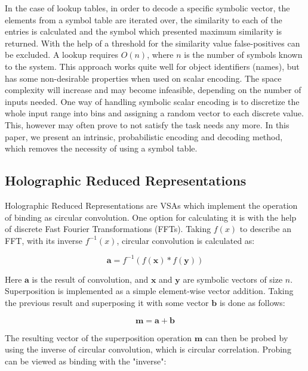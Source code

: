 \documentclass[a4paper,twoside]{article}
\begin{document}
	In the case of lookup tables, in order to decode a specific symbolic vector, the elements from a symbol table are iterated over, the similarity to each of the entries is calculated and the symbol which presented maximum similarity is returned. With the help of a threshold for the similarity value false-positives can be excluded. A lookup requires $O(n)$, where $n$ is the number of symbols known to the system. This approach works quite well for object identifiers (names), but has some non-desirable properties when used on scalar encoding. The space complexity will increase and may become infeasible, depending on the number of inputs needed. One way of handling symbolic scalar encoding is to discretize the whole input range into bins and assigning a random vector to each discrete value. This, however may often prove to not satisfy the task needs any more.
In this paper, we present an intrinsic, probabilistic encoding and decoding
method, which removes the necessity of using a symbol table.

	\subsection{Holographic Reduced Representations}
	\label{sec:hrr}
	
	Holographic Reduced Representations are VSAs which implement the operation of binding as circular convolution. One option for calculating it is with the help of discrete Fast Fourier Transformations (FFTs). Taking $f(x)$ to describe an FFT, with its inverse $f^{-1}(x)$, circular convolution is calculated as:
	
	\begin{equation}
	\pmb a = f^{-1}(f(\pmb x) * f(\pmb y))
	\end{equation}
	
	Here $\pmb a$ is the result of convolution, and $\pmb x$ and $\pmb y$ are symbolic vectors of size $n$.
Superposition is implemented as a simple element-wise vector addition. Taking the previous result and superposing it with some vector $\pmb b$ is done as follows:

	\begin{equation}
	\pmb m = \pmb a + \pmb b
	\end{equation}

The resulting vector of the superposition operation $\pmb m$ can then be probed
by using the inverse of circular convolution, which is circular correlation.
Probing can be viewed as binding with the "inverse":
	
\end{document}
